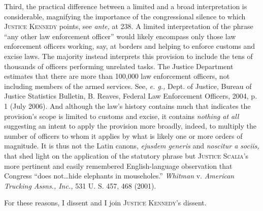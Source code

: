   Third, the practical difference between a limited and a broad interpretation is considerable, magnifying the importance of the congressional silence to which \textsc{Justice Kennedy} points, see \emph{ante,} at 238. A limited interpretation of the phrase ``any other law enforcement officer'' would likely encompass only those law enforcement officers working, say, at borders and helping to enforce customs and excise laws. The majority instead interprets this provision to include the tens of thousands of officers performing unrelated tasks. \newpage  The Justice Department estimates that there are more than 100,000 law enforcement officers, not including members of the armed services. See, \emph{e. g.,} Dept. of Justice, Bureau of Justice Statistics Bulletin, B. Reaves, Federal Law Enforcement Officers, 2004, p. 1 (July 2006). And although the law's history contains much that indicates the provision's scope is limited to customs and excise, it contains \emph{nothing at all} suggesting an intent to apply the provision more broadly, indeed, to multiply the number of officers to whom it applies by what is likely one or more orders of magnitude. It is thus not the Latin canons, \emph{ejusdem generis} and \emph{noscitur a sociis,} that shed light on the application of the statutory phrase but \textsc{Justice Scalia}'s more pertinent and easily remembered English-language observation that Congress ``does not\dots hide elephants in mouseholes.'' \emph{Whitman} v. \emph{American Trucking Assns., Inc.,} 531 U. S. 457, 468 (2001).

  For these reasons, I dissent and I join \textsc{Justice Kennedy}'s dissent.
